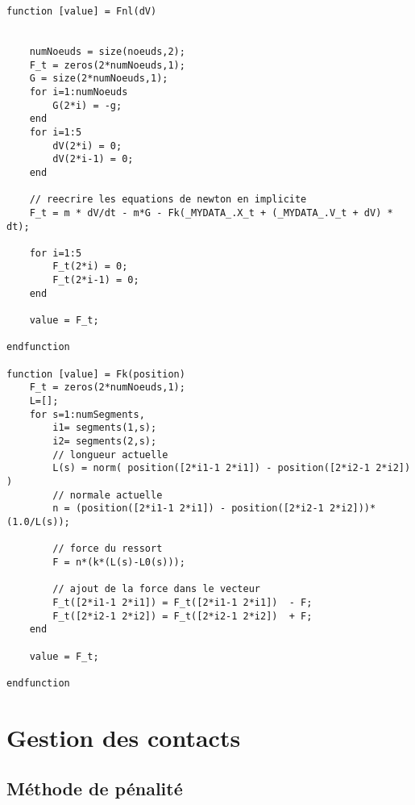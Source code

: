 \documentclass[a4paper,11pt]{article}
\begin{document}
\begin{lstlisting}[caption=Fonction permettant de réaliser l'intégration implicite]
function [value] = Fnl(dV)
    

    numNoeuds = size(noeuds,2);  
    F_t = zeros(2*numNoeuds,1);
    G = size(2*numNoeuds,1);
    for i=1:numNoeuds
        G(2*i) = -g;
    end
    for i=1:5
        dV(2*i) = 0;
        dV(2*i-1) = 0;
    end
    
    // reecrire les equations de newton en implicite
    F_t = m * dV/dt - m*G - Fk(_MYDATA_.X_t + (_MYDATA_.V_t + dV) * dt);
    
    for i=1:5
        F_t(2*i) = 0;
        F_t(2*i-1) = 0;
    end
    
    value = F_t;
    
endfunction

function [value] = Fk(position)
    F_t = zeros(2*numNoeuds,1);
    L=[];
    for s=1:numSegments,
        i1= segments(1,s);
        i2= segments(2,s);
        // longueur actuelle
        L(s) = norm( position([2*i1-1 2*i1]) - position([2*i2-1 2*i2]) )
        // normale actuelle
        n = (position([2*i1-1 2*i1]) - position([2*i2-1 2*i2]))*(1.0/L(s));
   
        // force du ressort
        F = n*(k*(L(s)-L0(s)));
        
        // ajout de la force dans le vecteur
        F_t([2*i1-1 2*i1]) = F_t([2*i1-1 2*i1])  - F;
        F_t([2*i2-1 2*i2]) = F_t([2*i2-1 2*i2])  + F;
    end
    
    value = F_t;

endfunction
\end{lstlisting}

\section{Gestion des contacts}
\subsection{Méthode de pénalité}
\end{document}
